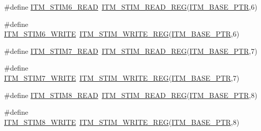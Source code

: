 \begin{DoxyCompactItemize}
\item 
\#define \hyperlink{group___i_t_m___register___accessor___macros_ga8a39db72396c8cd021762dbe2def218c}{I\+T\+M\+\_\+\+S\+T\+I\+M6\+\_\+\+R\+E\+AD}~\hyperlink{group___i_t_m___register___accessor___macros_ga5009882336aadcd4f37b45cf3395c450}{I\+T\+M\+\_\+\+S\+T\+I\+M\+\_\+\+R\+E\+A\+D\+\_\+\+R\+EG}(\hyperlink{group___i_t_m___peripheral_gafaddee8fe8b6a898d4e5edc43ee0d703}{I\+T\+M\+\_\+\+B\+A\+S\+E\+\_\+\+P\+TR},6)
\item 
\#define \hyperlink{group___i_t_m___register___accessor___macros_gab5f100af2978bf54186d5754e9676f5d}{I\+T\+M\+\_\+\+S\+T\+I\+M6\+\_\+\+W\+R\+I\+TE}~\hyperlink{group___i_t_m___register___accessor___macros_ga049ca92a4e78e77c19af81e51aa73f1c}{I\+T\+M\+\_\+\+S\+T\+I\+M\+\_\+\+W\+R\+I\+T\+E\+\_\+\+R\+EG}(\hyperlink{group___i_t_m___peripheral_gafaddee8fe8b6a898d4e5edc43ee0d703}{I\+T\+M\+\_\+\+B\+A\+S\+E\+\_\+\+P\+TR},6)
\item 
\#define \hyperlink{group___i_t_m___register___accessor___macros_gad3fb2b38ef6a9727bd3036cf014f3d61}{I\+T\+M\+\_\+\+S\+T\+I\+M7\+\_\+\+R\+E\+AD}~\hyperlink{group___i_t_m___register___accessor___macros_ga5009882336aadcd4f37b45cf3395c450}{I\+T\+M\+\_\+\+S\+T\+I\+M\+\_\+\+R\+E\+A\+D\+\_\+\+R\+EG}(\hyperlink{group___i_t_m___peripheral_gafaddee8fe8b6a898d4e5edc43ee0d703}{I\+T\+M\+\_\+\+B\+A\+S\+E\+\_\+\+P\+TR},7)
\item 
\#define \hyperlink{group___i_t_m___register___accessor___macros_ga5a34eadd8072ebc43f50398cb76171af}{I\+T\+M\+\_\+\+S\+T\+I\+M7\+\_\+\+W\+R\+I\+TE}~\hyperlink{group___i_t_m___register___accessor___macros_ga049ca92a4e78e77c19af81e51aa73f1c}{I\+T\+M\+\_\+\+S\+T\+I\+M\+\_\+\+W\+R\+I\+T\+E\+\_\+\+R\+EG}(\hyperlink{group___i_t_m___peripheral_gafaddee8fe8b6a898d4e5edc43ee0d703}{I\+T\+M\+\_\+\+B\+A\+S\+E\+\_\+\+P\+TR},7)
\item 
\#define \hyperlink{group___i_t_m___register___accessor___macros_ga84e344ea9bb6dd044130f918d1cd3f59}{I\+T\+M\+\_\+\+S\+T\+I\+M8\+\_\+\+R\+E\+AD}~\hyperlink{group___i_t_m___register___accessor___macros_ga5009882336aadcd4f37b45cf3395c450}{I\+T\+M\+\_\+\+S\+T\+I\+M\+\_\+\+R\+E\+A\+D\+\_\+\+R\+EG}(\hyperlink{group___i_t_m___peripheral_gafaddee8fe8b6a898d4e5edc43ee0d703}{I\+T\+M\+\_\+\+B\+A\+S\+E\+\_\+\+P\+TR},8)
\item 
\#define \hyperlink{group___i_t_m___register___accessor___macros_ga90288fe5645ad72d65bcf25a4e48cc23}{I\+T\+M\+\_\+\+S\+T\+I\+M8\+\_\+\+W\+R\+I\+TE}~\hyperlink{group___i_t_m___register___accessor___macros_ga049ca92a4e78e77c19af81e51aa73f1c}{I\+T\+M\+\_\+\+S\+T\+I\+M\+\_\+\+W\+R\+I\+T\+E\+\_\+\+R\+EG}(\hyperlink{group___i_t_m___peripheral_gafaddee8fe8b6a898d4e5edc43ee0d703}{I\+T\+M\+\_\+\+B\+A\+S\+E\+\_\+\+P\+TR},8)

\end{DoxyCompactItemize}
